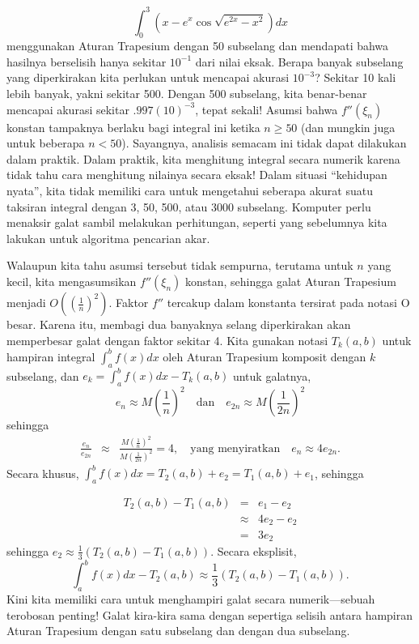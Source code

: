 \noindent
\[
\int_{0}^{3}\left(x-e^{x}\cos\sqrt{e^{2x}-x^{2}}\right)dx
\]
menggunakan Aturan Trapesium dengan 50 subselang dan mendapati bahwa
hasilnya berselisih hanya sekitar $10^{-1}$ dari nilai eksak. Berapa
banyak subselang yang diperkirakan kita perlukan untuk mencapai akurasi
$10^{-3}$? Sekitar 10 kali lebih banyak, yakni sekitar 500. Dengan
500 subselang, kita benar-benar mencapai akurasi sekitar $.997(10)^{-3}$,
tepat sekali! Asumsi bahwa $f''(\xi_{n})$ konstan tampaknya berlaku
bagi integral ini ketika $n\geq50$ (dan mungkin juga untuk beberapa
$n<50$). Sayangnya, analisis semacam ini tidak dapat dilakukan dalam
praktik. Dalam praktik, kita menghitung integral secara numerik karena
tidak tahu cara menghitung nilainya secara eksak! Dalam situasi ``kehidupan
nyata'', kita tidak memiliki cara untuk mengetahui seberapa akurat
suatu taksiran integral dengan 3, 50, 500, atau 3000 subselang. Komputer
perlu menaksir galat sambil melakukan perhitungan, seperti yang sebelumnya
kita lakukan untuk algoritma pencarian akar.

Walaupun kita tahu asumsi tersebut tidak sempurna, terutama untuk
 $n$ yang kecil, kita mengasumsikan $f''(\xi_{n})$ konstan, sehingga
galat Aturan Trapesium menjadi $O\left(\left(\frac{1}{n}\right)^{2}\right)$.
Faktor $f''$ tercakup dalam konstanta tersirat pada notasi O besar.
Karena itu, membagi dua banyaknya selang diperkirakan akan memperbesar
galat dengan faktor sekitar 4. Kita gunakan notasi $T_{k}(a,b)$ untuk
hampiran integral $\int_{a}^{b}f(x)dx$ oleh Aturan Trapesium komposit
dengan $k$ subselang, dan $e_{k}=\int_{a}^{b}f(x)dx-T_{k}(a,b)$
untuk galatnya,
\[
e_{n}\approx M\left(\frac{1}{n}\right)^{2}\quad\mbox{dan}\quad e_{2n}\approx M\left(\frac{1}{2n}\right)^{2}
\]
sehingga
\begin{eqnarray*}
\frac{e_{n}}{e_{2n}} & \approx & \frac{M\left(\frac{1}{n}\right)^{2}}{M\left(\frac{1}{2n}\right)^{2}}=4,\quad\mbox{yang menyiratkan}\quad e_{n}\approx4e_{2n}.
\end{eqnarray*}
Secara khusus, $\int_{a}^{b}f(x)dx=T_{2}(a,b)+e_{2}=T_{1}(a,b)+e_{1}$,
sehingga

\noindent
\begin{eqnarray*}
T_{2}(a,b)-T_{1}(a,b) & = & e_{1}-e_{2}\\
 & \approx & 4e_{2}-e_{2}\\
 & = & 3e_{2}
\end{eqnarray*}
sehingga $e_{2}\approx\frac{1}{3}(T_{2}(a,b)-T_{1}(a,b)).$ Secara
eksplisit, 
\[
\int_{a}^{b}f(x)dx-T_{2}(a,b)\approx\frac{1}{3}(T_{2}(a,b)-T_{1}(a,b)).
\]
Kini kita memiliki cara untuk menghampiri galat secara numerik---sebuah
terobosan penting! Galat kira-kira sama dengan sepertiga selisih antara
hampiran Aturan Trapesium dengan satu subselang dan dengan dua subselang.

